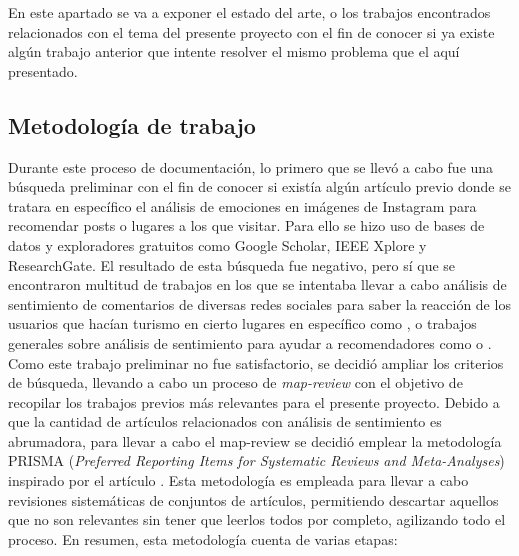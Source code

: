 

En este apartado se va a exponer el estado del arte, o los trabajos encontrados relacionados con el tema del presente proyecto con el fin de conocer si ya existe algún trabajo anterior que intente resolver el mismo problema que el aquí presentado.\\

\subsection{Metodología de trabajo}

Durante este proceso de documentación, lo primero que se llevó a cabo fue una búsqueda preliminar con el fin de conocer si existía algún artículo previo donde se tratara en específico el análisis de emociones en imágenes de Instagram para recomendar posts o lugares a los que visitar. Para ello se hizo uso de bases de datos y exploradores gratuitos como Google Scholar, IEEE Xplore y ResearchGate. El resultado de esta búsqueda fue negativo, pero sí que se encontraron multitud de trabajos en los que se intentaba llevar a cabo análisis de sentimiento de comentarios de diversas redes sociales para saber la reacción de los usuarios que hacían turismo en cierto lugares en específico como \cite{8720960}, o trabajos generales sobre análisis de sentimiento para ayudar a recomendadores como \cite{techniques_media_based_recom} o \cite{recom_sys_sen_analysis}.\\

Como este trabajo preliminar no fue satisfactorio, se decidió ampliar los criterios de búsqueda, llevando a cabo un proceso de \textit{map-review} con el objetivo de recopilar los trabajos previos más relevantes para el presente proyecto. Debido a que la cantidad de artículos relacionados con análisis de sentimiento es abrumadora, para llevar a cabo el map-review se decidió emplear la metodología PRISMA (\textit{Preferred Reporting Items for Systematic Reviews and Meta-Analyses}) inspirado por el artículo \cite{recom_metodo_tutor}. Esta metodología es empleada para llevar a cabo revisiones sistemáticas de conjuntos de artículos, permitiendo descartar aquellos que no son relevantes sin tener que leerlos todos por completo, agilizando todo el proceso. En resumen, esta metodología cuenta de varias etapas:

